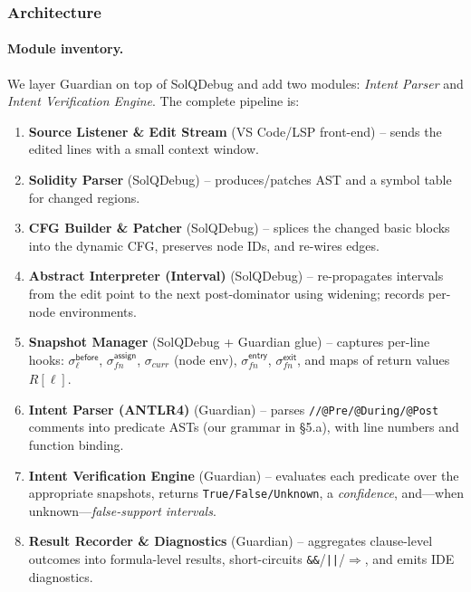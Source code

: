 \documentclass[10pt, conference]{IEEEtran}
\begin{document}
\subsubsection{Architecture}

\paragraph{Module inventory.}
We layer Guardian on top of SolQDebug and add two modules:
\emph{Intent Parser} and \emph{Intent Verification Engine}.
The complete pipeline is:

\begin{enumerate}[leftmargin=*,label=(A\arabic*)]
  \item \textbf{Source Listener \& Edit Stream} (VS Code/LSP front-end)
        – sends the edited lines with a small context window.
  \item \textbf{Solidity Parser} (SolQDebug)
        – produces/patches AST and a symbol table for changed regions.
  \item \textbf{CFG Builder \& Patcher} (SolQDebug)
        – splices the changed basic blocks into the dynamic CFG,
          preserves node IDs, and re-wires edges.
  \item \textbf{Abstract Interpreter (Interval)} (SolQDebug)
        – re-propagates intervals from the edit point to the next
          post-dominator using widening; records per-node environments.
  \item \textbf{Snapshot Manager} (SolQDebug + Guardian glue)
        – captures per-line hooks:
        \(\sigma^{\mathsf{before}}_{\ell}\),
        \(\sigma^{\mathsf{assign}}_{\mathit{fn}}\),
        \(\sigma_{\mathit{curr}}\) (node env),
        \(\sigma^{\mathsf{entry}}_{\mathit{fn}}\),
        \(\sigma^{\mathsf{exit}}_{\mathit{fn}}\),
        and maps of return values \(R[\ell]\).
  \item \textbf{Intent Parser (ANTLR4)} (Guardian)
        – parses \verb|//@Pre/@During/@Post| comments into
          predicate ASTs (our grammar in §5.a),
          with line numbers and function binding.
  \item \textbf{Intent Verification Engine} (Guardian)
        – evaluates each predicate over the appropriate snapshots,
          returns \texttt{True/False/Unknown}, a \emph{confidence},
          and—when unknown—\emph{false-support intervals}.
  \item \textbf{Result Recorder \& Diagnostics} (Guardian)
        – aggregates clause-level outcomes into formula-level results,
          short-circuits \texttt{&&}/\texttt{||}/\(\Rightarrow\),
          and emits IDE diagnostics.
\end{enumerate}
\end{document}
